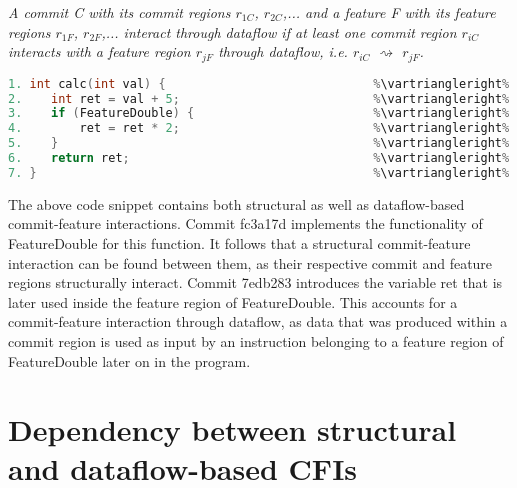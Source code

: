 \begin{definition}\label{def:dataflow_cfi}
\emph{A commit C with its commit regions $r_{1C}$, $r_{2C}$,... and a feature F with its feature regions $r_{1F}$, $r_{2F}$,... interact through dataflow if at least one commit region $r_{iC}$ interacts with a feature region $r_{jF}$ through dataflow, i.e. $r_{iC}$ $\rightsquigarrow$ $r_{jF}$.}
\end{definition}

\begin{lstlisting}[language=C++, caption={Illustration of Structural and Dataflow-based CFIs}, label=DescriptiveLabel]	
1. int calc(int val) {                             %\vartriangleright% %\texttt{d93df4a}%
2.    int ret = val + 5;                           %\vartriangleright% %\texttt{7edb283}%
3.    if (FeatureDouble) {                         %\vartriangleright% %\texttt{fc3a17d}%    %\vartriangleright% %FeatureDouble%
4.        ret = ret * 2;                           %\vartriangleright% %\texttt{fc3a17d}%    %\vartriangleright% %FeatureDouble%
5.    }                                            %\vartriangleright% %\texttt{fc3a17d}%    %\vartriangleright% %FeatureDouble%
6.    return ret;                                  %\vartriangleright% %\texttt{d93df4a}%   
7. }                                               %\vartriangleright% %\texttt{d93df4a}%   
\end{lstlisting}
The above code snippet contains both structural as well as dataflow-based commit-feature interactions.
Commit \textsf{fc3a17d} implements the functionality of \textsf{FeatureDouble} for this function.
It follows that a structural commit-feature interaction can be found between them, as their respective commit and feature regions structurally interact.
Commit \textsf{7edb283} introduces the variable \textsf{ret} that is later used inside the feature region of \textsf{FeatureDouble}. 
This accounts for a commit-feature interaction through dataflow, as data that was produced within a commit region is used as input 
by an instruction belonging to a feature region of \textsf{FeatureDouble} later on in the program.

\section{Dependency between structural and dataflow-based CFIs}\label{sec:combination_cfis}


